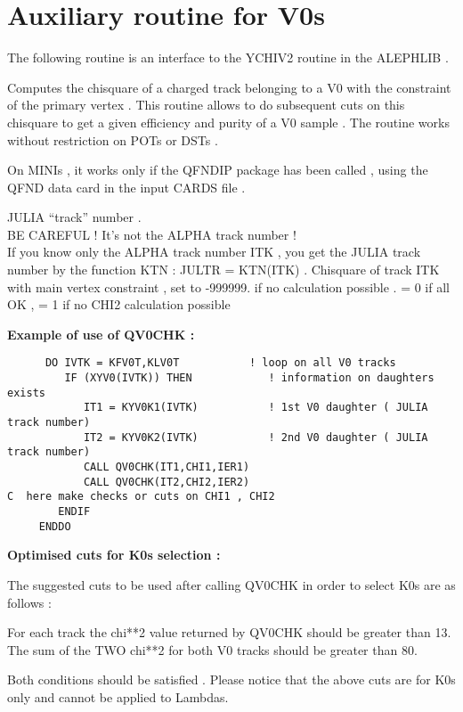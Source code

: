 \section{\label{sec-QV0CK}Auxiliary routine for V0s}
\par
The following routine is an interface to the YCHIV2 routine in the ALEPHLIB .
\par
\noindent{}
\par
\noindent Computes the chisquare of a charged track belonging to a V0 with the
constraint of the primary vertex . This routine allows to do subsequent cuts on this
chisquare to get a given efficiency and purity of a V0 sample .
The routine works without restriction on POTs or DSTs .
\par
On MINIs , it works only if
the QFNDIP package has been called , using the QFND data card in the input CARDS file .
\par
\begin{indentlist}{ 3.25cm}{ 3.50cm}
JULIA ``track'' number .\\
 BE CAREFUL ! It's not the ALPHA track number !\\
 If you know only the ALPHA track number ITK , you get the JULIA track number by
 the function KTN : JULTR = KTN(ITK) .
Chisquare of track ITK with main vertex constraint ,
set to -999999. if no calculation possible .
= 0 if all OK , = 1 if no CHI2 calculation possible
\end{indentlist}
 
{\bf Example of use of QV0CHK :}
 
\begin{verbatim}
      DO IVTK = KFV0T,KLV0T           ! loop on all V0 tracks
         IF (XYV0(IVTK)) THEN            ! information on daughters exists
            IT1 = KYV0K1(IVTK)           ! 1st V0 daughter ( JULIA track number)
            IT2 = KYV0K2(IVTK)           ! 2nd V0 daughter ( JULIA track number)
            CALL QV0CHK(IT1,CHI1,IER1)
            CALL QV0CHK(IT2,CHI2,IER2)
C  here make checks or cuts on CHI1 , CHI2
        ENDIF
     ENDDO
\end{verbatim}
 
 
{\bf Optimised cuts for K0s selection :}
 
The suggested cuts to be used after calling QV0CHK in order to select
K0s are as follows :
 
\par
\begin{indentlist}{ 3.25cm}{ 3.50cm}
For each track the chi**2 value returned by QV0CHK should be greater than 13.
The sum of the TWO chi**2 for both V0 tracks should be greater than 80.
\end{indentlist}
Both conditions should be satisfied . Please notice that the above
cuts are for K0s only and cannot be applied to Lambdas.
 
